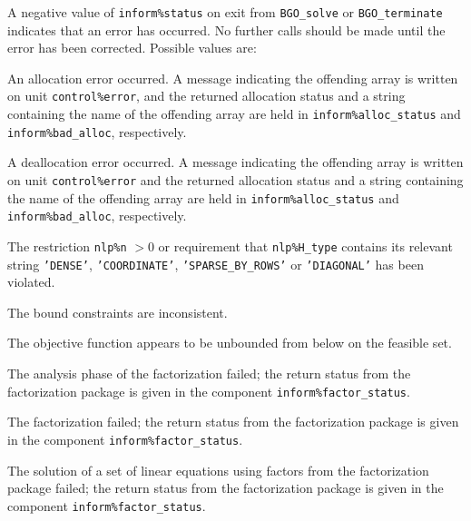 \documentclass{galahad}
\newcommand{\packagename}{BGO}
\begin{document}

\galerrors
A negative value of {\tt inform\%status} on exit from
{\tt \packagename\_solve}
or
{\tt \packagename\_terminate}
indicates that an error has occurred. No further calls should be made
until the error has been corrected. Possible values are:

\begin{description}

 An allocation error occurred.
A message indicating the offending
array is written on unit {\tt control\%error}, and the returned allocation
status and a string containing the name of the offending array
are held in {\tt inform\%alloc\_\-status}
and {\tt inform\%bad\_alloc}, respectively.

 A deallocation error occurred.
A message indicating the offending
array is written on unit {\tt control\%error} and the returned allocation
status and a string containing the name of the offending array
are held in {\tt inform\%alloc\_\-status}
and {\tt inform\%bad\_alloc}, respectively.

  The restriction {\tt nlp\%n} $> 0$
  or requirement that {\tt nlp\%H\_type} contains its relevant string
  {\tt 'DENSE'}, {\tt 'COORDINATE'}, {\tt 'SPARSE\_BY\_ROWS'}
  or {\tt 'DIAGONAL'}
  has been violated.


 The bound constraints are inconsistent.

  The objective function appears to be unbounded
 from below on the feasible set.

 The analysis phase of the factorization failed;
 the return status from the factorization
    package is given in the component {\tt inform\%fac\-t\-or\_status}.

 The factorization failed;
 the return status from the factorization
    package is given in the component {\tt inform\%fac\-t\-or\_status}.

 The solution of a set of linear equations
 using factors from the factorization package failed;
 the return status from the factorization
    package is given in the component {\tt inform\%fac\-t\-or\_status}.


\end{description}
\end{document}
